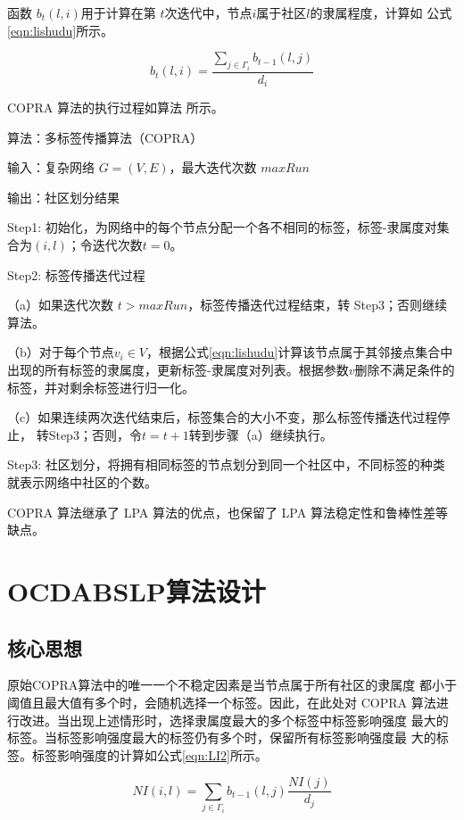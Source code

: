 函数 $b_t(l, i)$用于计算在第 $t $次迭代中，节点$ i $属于社区$ l $的隶属程度，计算如
公式\ref{eqn:lishudu}所示。

\begin{equation}
  \label{eqn:lishudu}
  b_t(l,i)=\frac{\sum_{j\in \Gamma_i }b_{t-1}(l,j)}{d_i}
\end{equation}

COPRA 算法的执行过程如算法 所示。

算法：多标签传播算法（COPRA） 

输入：复杂网络 $G = (V, E)$，最大迭代次数 $maxRun$ 

输出：社区划分结果 

Step1:  初始化，为网络中的每个节点分配一个各不相同的标签，标签-隶属度对集合为${(i,l)}$；令迭代次数$t=0$。

Step2:  标签传播迭代过程 

（a）如果迭代次数 $t > maxRun$，标签传播迭代过程结束，转 Step3；否则继续算法。 

（b）对于每个节点$v_i\in V$，根据公式\ref{eqn:lishudu}计算该节点属于其邻接点集合中出现的所有标签的隶属度，更新标签-隶属度对列表。根据参数$v$删除不满足条件的标签，并对剩余标签进行归一化。 
 
（c）如果连续两次迭代结束后，标签集合的大小不变，那么标签传播迭代过程停止，
转Step3；否则，令$t = t+1$转到步骤（a）继续执行。 

Step3:  社区划分，将拥有相同标签的节点划分到同一个社区中，不同标签的种类就表示网络中社区的个数。

COPRA 算法继承了 LPA 算法的优点，也保留了 LPA 算法稳定性和鲁棒性差等缺点。 

\section{OCDABSLP算法设计}

\subsection{核心思想}
原始COPRA算法中的唯一一个不稳定因素是当节点属于所有社区的隶属度
都小于阈值且最大值有多个时，会随机选择一个标签。因此，在此处对 COPRA
算法进行改进。当出现上述情形时，选择隶属度最大的多个标签中标签影响强度
最大的标签。当标签影响强度最大的标签仍有多个时，保留所有标签影响强度最
大的标签。标签影响强度的计算如公式\ref{eqn:LI2}所示。

\begin{equation}
  \label{eqn:LI2}
  NI(i,l)=\sum_{j \in \Gamma _i} b_{t-1}(l,j) \frac{NI(j)}{d_j}
\end{equation}

